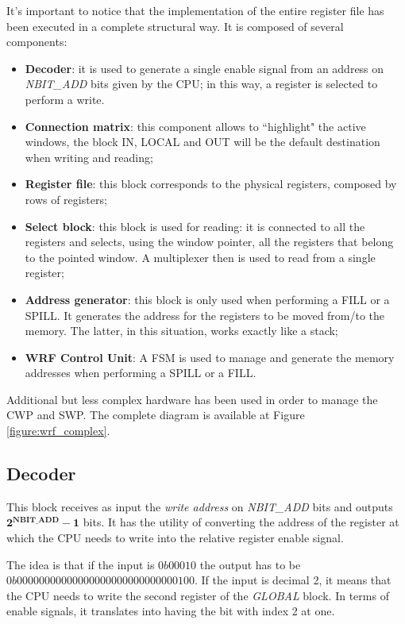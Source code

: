 It's important to notice that the implementation of the entire register file has been executed in a complete structural way. It is composed of several components:
\begin{itemize}
	\item \textbf{Decoder}: it is used to generate a single enable signal from an address on \emph{NBIT\_ADD} bits given by the CPU; in this way, a register is selected to perform a write. 
	\item \textbf{Connection matrix}: this component allows to ``highlight" the active windows, the block IN, LOCAL and OUT will be the default destination when writing and reading;
	\item \textbf{Register file}: this block corresponds to the physical registers, composed by rows of registers;
	\item \textbf{Select block}: this block is used for reading: it is connected to all the registers and selects, using the window pointer, all the registers that belong to the pointed window. A multiplexer then is used to read from a single register;
	\item \textbf{Address generator}: this block is only used when performing a FILL or a SPILL. It generates the address for the registers to be moved from/to the memory. The latter, in this situation, works exactly like a stack;
	\item \textbf{WRF Control Unit}: A FSM is used to manage and generate the memory addresses when performing a SPILL or a FILL.
\end{itemize}

Additional but less complex hardware has been used in order to manage the CWP and SWP. The complete diagram is available at Figure \ref{figure:wrf_complex}.


\subsection{Decoder}
This block receives as input the \emph{write address} on \emph{NBIT\_ADD} bits and outputs \(\mathbf{2^{NBIT\_ADD} - 1} \) bits. It has the utility of converting the address of the register at which the CPU needs to write into the relative register enable signal. 

The idea is that if the input is \(0b00010\) the output has to be \(0b00000000000000000000000000000100\). If the input is decimal 2, it means that the CPU needs to write the second register of the \emph{GLOBAL} block. In terms of enable signals, it translates into having the bit with index 2 at one. \\

